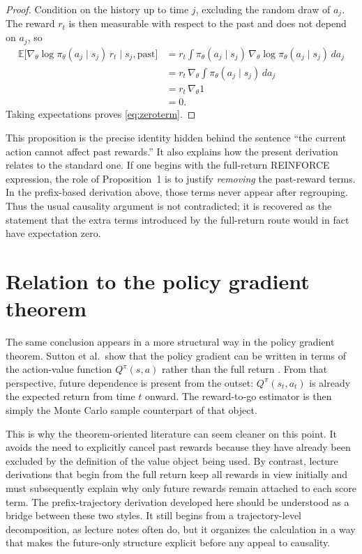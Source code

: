 \documentclass[11pt]{article}
\begin{document}
\begin{proof}
Condition on the history up to time $j$, excluding the random draw of $a_j$. The reward $r_t$ is then measurable with respect to the past and does not depend on $a_j$, so
\begin{align*}
\mathbb E\big[\nabla_\theta\log\pi_\theta(a_j\mid s_j)\,r_t\mid s_j,\text{past}\big]
&=r_t\int \pi_\theta(a_j\mid s_j)\,\nabla_\theta\log\pi_\theta(a_j\mid s_j)\,da_j \\
&=r_t\,\nabla_\theta\int \pi_\theta(a_j\mid s_j)\,da_j \\
&=r_t\,\nabla_\theta 1 \\
&=0.
\end{align*}
Taking expectations proves \eqref{eq:zeroterm}.
\end{proof}

This proposition is the precise identity hidden behind the sentence ``the current action cannot affect past rewards.'' It also explains how the present derivation relates to the standard one. If one begins with the full-return REINFORCE expression, the role of Proposition~1 is to justify \emph{removing} the past-reward terms. In the prefix-based derivation above, those terms never appear after regrouping. Thus the usual causality argument is not contradicted; it is recovered as the statement that the extra terms introduced by the full-return route would in fact have expectation zero.

\section{Relation to the policy gradient theorem}
The same conclusion appears in a more structural way in the policy gradient theorem. Sutton et al.\ show that the policy gradient can be written in terms of the action-value function $Q^{\pi}(s,a)$ rather than the full return \cite{sutton1999}. From that perspective, future dependence is present from the outset: $Q^{\pi}(s_t,a_t)$ is already the expected return from time $t$ onward. The reward-to-go estimator is then simply the Monte Carlo sample counterpart of that object.

This is why the theorem-oriented literature can seem cleaner on this point. It avoids the need to explicitly cancel past rewards because they have already been excluded by the definition of the value object being used. By contrast, lecture derivations that begin from the full return keep all rewards in view initially and must subsequently explain why only future rewards remain attached to each score term. The prefix-trajectory derivation developed here should be understood as a bridge between these two styles. It still begins from a trajectory-level decomposition, as lecture notes often do, but it organizes the calculation in a way that makes the future-only structure explicit before any appeal to causality.
\end{document}
